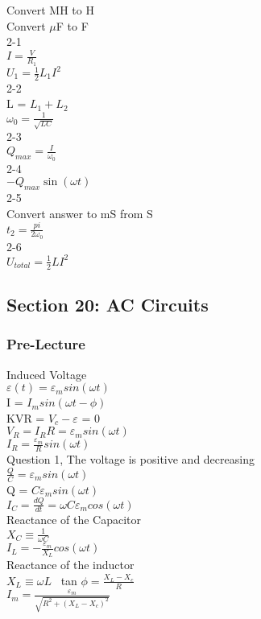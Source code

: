 \documentclass{article}
\begin{document}
\noindent
Convert MH to H \\
Convert $\mu$F to F \\
2-1 \\
$I = \frac{V}{R_1}$ \\
$U_1 = \frac{1}{2} L_1 I^2$ \\
2-2 \\
L = $L_1 + L_2$ \\
$\omega_0 = \frac{1}{\sqrt{L C}}$ \\
2-3 \\
$Q_{max} = \frac{I}{\omega_0}$ \\
2-4 \\
$-Q_{max} \sin(\omega t)$ \\
2-5 \\
Convert answer to mS from S\\
$t_2 = \frac{pi}{2 \omega_0}$ \\
2-6 \\
$U_{total} = \frac{1}{2} L I^2$

\subsection{Section 20: AC Circuits}
\subsubsection{Pre-Lecture}
\noindent
Induced Voltage \\
$\varepsilon(t) = \varepsilon_m sin(\omega t)$ \\
I = $I_m sin (\omega t - \phi)$ \\
KVR = $V_c - \varepsilon$ = 0 \\
$V_R = I_R R = \varepsilon_m sin (\omega t) $ \\
$I_R = \frac{\varepsilon_m}{R} sin(\omega t)$ \\
Question 1, The voltage is positive and decreasing \\
$\frac{Q}{C} = \varepsilon_m sin(\omega t) $ \\
Q = $C \varepsilon_m sin (\omega t)$ \\
$I_C = \frac{dQ}{dt} = \omega C \varepsilon_m cos (\omega t)$ \\
Reactance of the Capacitor \\
$X_C \equiv \frac{1}{\omega C}$ \\
$I_L = -\frac{\varepsilon_m}{X_L} cos (\omega t)$ \\
Reactance of the inductor \\
$X_L \equiv \omega L$ \
tan $\phi = \frac{X_L - X_c}{R}$ \\
$I_m = \frac{\varepsilon_m}{\sqrt{R^2 + (X_L - X_c)^2}}$ 
\end{document}
